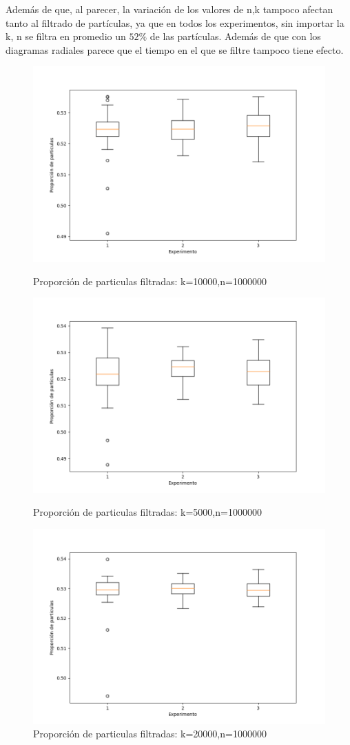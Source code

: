\documentclass{article}
\begin{document}
Además de que, al parecer, la variación de los valores de n,k tampoco afectan tanto al filtrado de partículas, ya que en todos los experimentos, sin importar la k, n se filtra en promedio un $52 \%$ de las partículas. Además de que con los diagramas radiales parece que el tiempo en el que se filtre tampoco tiene efecto.\\	
\newpage


	
\begin{figure}[h!]
	\centering
	\includegraphics[width=0.5\linewidth]{bx_1.png}
	\caption{Proporción de particulas filtradas: k=10000,n=1000000}
	\label{fig:bx2}
	
	
	\includegraphics[width=0.5\linewidth]{bx_2.png}
	\caption{Proporción de particulas filtradas: k=5000,n=1000000}
	\label{fig:bx3}
	
	\includegraphics[width=0.5\linewidth]{bx_3.png}
	\caption{Proporción de particulas filtradas: k=20000,n=1000000}
	\label{fig:bx4}
	
\end{figure}
\end{document}
